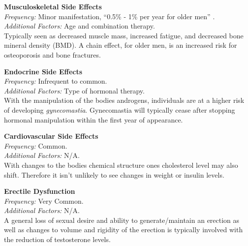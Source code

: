 \documentclass[journal]{vgtc}                %
\begin{document}
                        \textbf{Musculoskeletal Side Effects}
                        \\ \textit{Frequency:} Minor manifestation, ``0.5\% - 1\% per year for older men'' \cite{AdverseEvents:2005}.
                        \\ \textit{Additional Factors:} Age and combination therapy.
                        \\ Typically seen as decreased muscle mass, increased fatigue, and decreased bone mineral density (BMD).
                        A chain effect, for older men, is an increased risk for osteoporosis and bone fractures. \cite{AdverseEvents:2005}
                        \newline

                        \textbf{Endocrine Side Effects}
                        \\ \textit{Frequency:} Infrequent to common.
                        \\ \textit{Additional Factors:} Type of hormonal therapy.
                        \\ With the manipulation of the bodies androgens, individuals are at a higher risk of developing \textit{gynecomastia}.
                        Gynecomastia will typically cease after stopping hormonal manipulation within the first year of appearance.
                        \newline

                        \textbf{Cardiovascular Side Effects}
                        \\ \textit{Frequency:} Common.
                        \\ \textit{Additional Factors:} N/A.
                        \\ With changes to the bodies chemical structure ones cholesterol level may also shift.
                        Therefore it isn't unlikely to see changes in weight or insulin levels. \cite{AdverseEvents:2005}
                        \newline

                        \textbf{Erectile Dysfunction}
                        \\ \textit{Frequency:} Very Common.
                        \\ \textit{Additional Factors:} N/A.
                        \\ A general loss of sexual desire and ability to generate/maintain an erection as well as changes to volume and rigidity of the erection is typically involved with the reduction of testosterone levels.
                        \newline
\end{document}
